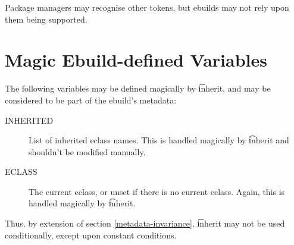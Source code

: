 Package managers may recognise other tokens, but ebuilds may not rely upon them being supported.


\section{Magic Ebuild-defined Variables}

The following variables may be defined magically by \t{inherit}, and may be considered to be part
of the ebuild's metadata:

\begin{description}
\item[INHERITED] List of inherited eclass names. This is handled magically by \t{inherit} and
    shouldn't be modified manually.
\item[ECLASS] The current eclass, or unset if there is no current eclass. Again, this is handled
    magically by \t{inherit}.
\end{description}

\note Thus, by extension of section \ref{metadata-invariance}, \t{inherit} may not be used
    conditionally, except upon constant conditions.


